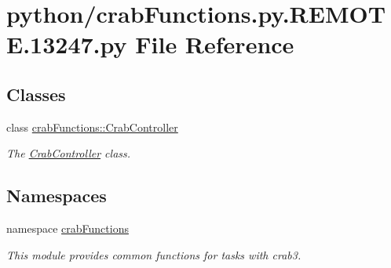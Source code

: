 \section{python/crabFunctions.py.REMOTE.13247.py File Reference}
\label{crabFunctions_8py_8REMOTE_813247_8py}
\subsection*{Classes}
\begin{DoxyCompactItemize}
\item 
class \hyperlink{classcrabFunctions_1_1CrabController}{crabFunctions::CrabController}
\begin{DoxyCompactList}\small\item\em The \hyperlink{classcrabFunctions_1_1CrabController}{CrabController} class. \item\end{DoxyCompactList}\end{DoxyCompactItemize}
\subsection*{Namespaces}
\begin{DoxyCompactItemize}
\item 
namespace \hyperlink{namespacecrabFunctions}{crabFunctions}


\begin{DoxyCompactList}\small\item\em This module provides common functions for tasks with crab3. \item\end{DoxyCompactList}\end{DoxyCompactItemize}
